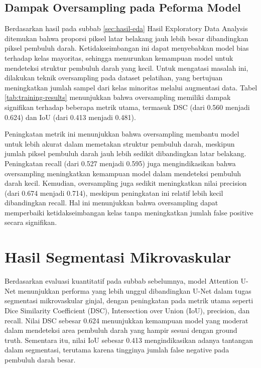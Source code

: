 \subsection{Dampak Oversampling pada Peforma Model}


\noindent Berdasarkan hasil pada subbab \ref{sec:hasil-eda} Hasil Exploratory Data Analysis ditemukan bahwa proporsi piksel latar belakang jauh lebih besar dibandingkan piksel pembuluh darah. Ketidakseimbangan ini dapat menyebabkan model bias terhadap kelas mayoritas, sehingga menurunkan kemampuan model untuk mendeteksi struktur pembuluh darah yang kecil. Untuk mengatasi masalah ini, dilakukan teknik oversampling pada dataset pelatihan, yang bertujuan meningkatkan jumlah sampel dari kelas minoritas melalui augmentasi data. Tabel \ref{tab:training-results} menunjukkan bahwa oversampling memiliki dampak signifikan terhadap beberapa metrik utama, termasuk DSC (dari 0.560 menjadi 0.624) dan IoU (dari 0.413 menjadi 0.481).

\noindent Peningkatan metrik ini menunjukkan bahwa oversampling membantu model untuk lebih akurat dalam memetakan struktur pembuluh darah, meskipun jumlah piksel pembuluh darah jauh lebih sedikit dibandingkan latar belakang. Peningkatan recall (dari 0.527 menjadi 0.595) juga mengindikasikan bahwa oversampling meningkatkan kemampuan model dalam mendeteksi pembuluh darah kecil. Kemudian, oversampling juga sedikit meningkatkan nilai precision (dari 0.674 menjadi 0.714), meskipun peningkatan ini relatif lebih kecil dibandingkan recall. Hal ini menunjukkan bahwa oversampling dapat memperbaiki ketidakseimbangan kelas tanpa meningkatkan jumlah false positive secara signifikan.



\section{Hasil Segmentasi Mikrovaskular}

\noindent Berdasarkan evaluasi kuantitatif pada subbab sebelumnya, model Attention U-Net menunjukkan performa yang lebih unggul dibandingkan U-Net dalam tugas segmentasi mikrovaskular ginjal, dengan peningkatan pada metrik utama seperti Dice Similarity Coefficient (DSC), Intersection over Union (IoU), precision, dan recall. Nilai DSC sebesar 0.624 menunjukkan kemampuan model yang moderat dalam mendeteksi area pembuluh darah yang hampir sesuai dengan ground truth. Sementara itu, nilai IoU sebesar 0.413 mengindikasikan adanya tantangan dalam segmentasi, terutama karena tingginya jumlah false negative pada pembuluh darah besar.


